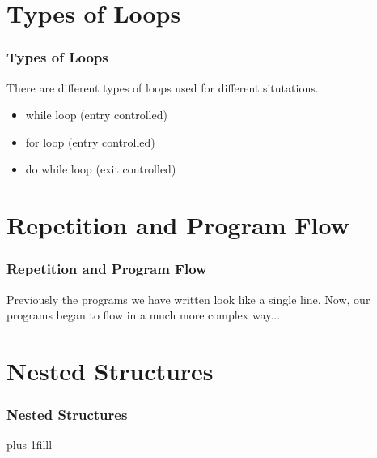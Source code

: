 \documentclass[fleqn]{beamer} %
\newcommand{\sectiontitleII}{Types of Loops }
\newcommand{\sectiontitleIII}{Repetition and Program Flow}
\newcommand{\sectiontitleIV}{Nested Structures}
\newcommand{\btVFill}{\vskip0pt plus 1filll}
\begin{document}
\section{\sectiontitleII}

	\begin{frame}[label=sectionII,containsverbatim] \small
		\frametitle{\sectiontitleII}
	
	There are different types of loops used for different situtations. 
		
	\begin{itemize}
		\item while loop (entry controlled)
		\item for loop (entry controlled)
		\item do while loop (exit controlled)	
	\end{itemize}


		
	\end{frame}

\section{\sectiontitleIII}

	\begin{frame}[label=sectionIII,containsverbatim] \small
	\frametitle{\sectiontitleIII}
	
Previously the programs we have written look like a single line. Now, our programs began to flow in a much more complex way...  \vspace{5mm}\\
			
			\vspace{40mm}
	
	\end{frame}

\section{\sectiontitleIV}	
	\begin{frame}[label=sectionIV,containsverbatim] \small
		\frametitle{\sectiontitleIV}    
	
		

		 

		\btVFill
	\end{frame}
\end{document}
